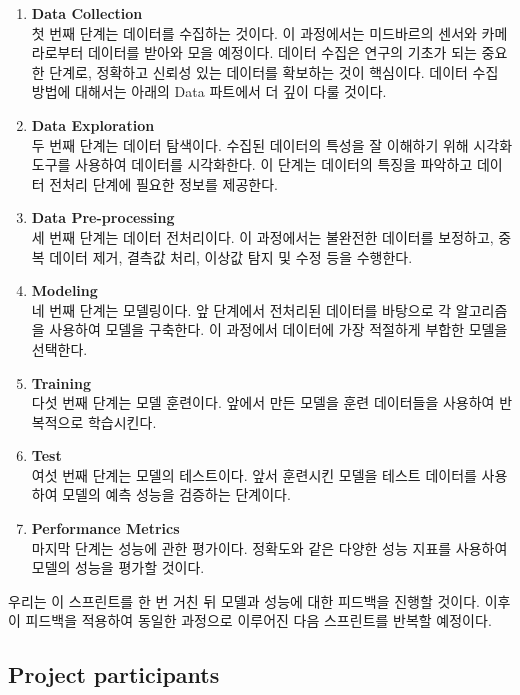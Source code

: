 \documentclass[11pt]{article}
\begin{document}
\begin{enumerate}
    \item \textbf{Data Collection}\\
    첫 번째 단계는 데이터를 수집하는 것이다. 이 과정에서는 미드바르의 센서와 카메라로부터 데이터를 받아와 모을 예정이다. 데이터 수집은 연구의 기초가 되는 중요한 단계로, 정확하고 신뢰성 있는 데이터를 확보하는 것이 핵심이다. 데이터 수집 방법에 대해서는 아래의 Data 파트에서 더 깊이 다룰 것이다.

    \item \textbf{Data Exploration}\\
    두 번째 단계는 데이터 탐색이다. 수집된 데이터의 특성을 잘 이해하기 위해 시각화 도구를 사용하여 데이터를 시각화한다. 이 단계는 데이터의 특징을 파악하고 데이터 전처리 단계에 필요한 정보를 제공한다.

    \item \textbf{Data Pre-processing}\\
    세 번째 단계는 데이터 전처리이다. 이 과정에서는 불완전한 데이터를 보정하고, 중복 데이터 제거, 결측값 처리, 이상값 탐지 및 수정 등을 수행한다.

    \item \textbf{Modeling}\\
    네 번째 단계는 모델링이다. 앞 단계에서 전처리된 데이터를 바탕으로 각 알고리즘을 사용하여 모델을 구축한다. 이 과정에서 데이터에 가장 적절하게 부합한 모델을 선택한다.

    \item \textbf{Training}\\
    다섯 번째 단계는 모델 훈련이다. 앞에서 만든 모델을 훈련 데이터들을 사용하여 반복적으로 학습시킨다.

    \item \textbf{Test}\\
    여섯 번째 단계는 모델의 테스트이다. 앞서 훈련시킨 모델을 테스트 데이터를 사용하여 모델의 예측 성능을 검증하는 단계이다.

    \item \textbf{Performance Metrics}\\
    마지막 단계는 성능에 관한 평가이다. 정확도와 같은 다양한 성능 지표를 사용하여 모델의 성능을 평가할 것이다.
\end{enumerate}

우리는 이 스프린트를 한 번 거친 뒤 모델과 성능에 대한 피드백을 진행할 것이다. 이후 이 피드백을 적용하여 동일한 과정으로 이루어진 다음 스프린트를 반복할 예정이다.
      
    \subsection{Project participants}                       
\end{document}
